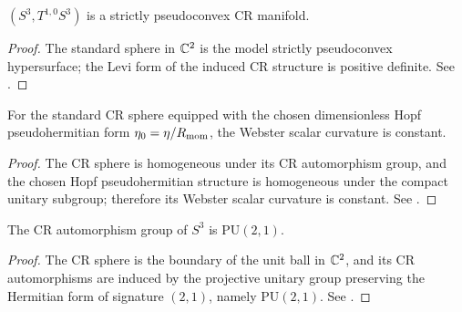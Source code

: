 \documentclass[11pt]{article}
\begin{document}
\begin{theorem}

\label{p1a:theorem:atlas-s-3-t-1-0-s-3-is-a-strictly-pseudoconvex-cr-ma-885227d}
$(S^3, T^{1,0}S^3)$ is a strictly pseudoconvex CR manifold.
\cite{chernmoser1974,dragomirtomassini2006cr}
\end{theorem}

\begin{proof}
The standard sphere in \(\mathbb{C}^2\) is the model strictly pseudoconvex hypersurface; the Levi form of the induced CR structure is positive definite. See \cite{chernmoser1974,dragomirtomassini2006cr}.
\end{proof}

\begin{theorem}

\label{p1a:theorem:atlas-for-the-standard-cr-sphere-equipped-with-the-c-5c675bb}
For the standard CR sphere equipped with the chosen dimensionless Hopf pseudohermitian form \(\eta_0=\eta/R_{\mathrm{mom}}\), the Webster scalar curvature is constant. \cite{chernmoser1974,dragomirtomassini2006cr}
\end{theorem}

\begin{proof}
The CR sphere is homogeneous under its CR automorphism group, and the chosen Hopf pseudohermitian structure is homogeneous under the compact unitary subgroup; therefore its Webster scalar curvature is constant. See \cite{chernmoser1974,dragomirtomassini2006cr}.
\end{proof}

\begin{theorem}

\label{p1a:theorem:atlas-the-cr-automorphism-group-of-s-3-is-pu-2-1-90b1123}
The CR automorphism group of $S^3$ is $\mathrm{PU}(2,1)$.
\cite{chernmoser1974,dragomirtomassini2006cr}
\end{theorem}

\begin{proof}
The CR sphere is the boundary of the unit ball in \(\mathbb{C}^2\), and its CR automorphisms are induced by the projective unitary group preserving the Hermitian form of signature \((2,1)\), namely \(\mathrm{PU}(2,1)\). See \cite{chernmoser1974,dragomirtomassini2006cr}.
\end{proof}
\end{document}
